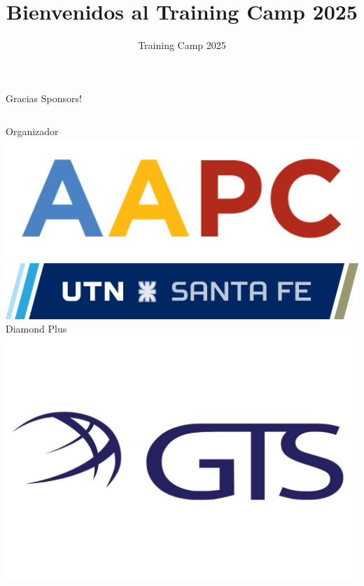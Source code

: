 \documentclass{beamer}
\title %
{Bienvenidos al Training Camp 2025}
\institute[]{Universidad Tecnológica Nacional - Facultad Regional Santa Fe}
\date[TC 2025]{Training Camp 2025}
\begin{document}
\frame{\titlepage}




\begin{frame}{Gracias Sponsors!}
    \begin{columns}[t]
        \centering
        Organizador\\
        \vspace{0.5cm}
        \includegraphics[width=1\textwidth,keepaspectratio]{logos/aapc.png}
        \includegraphics[width=1\textwidth,keepaspectratio]{logos/utn_santafe.png}
        \centering
        Diamond Plus\\
        \includegraphics[width=1\textwidth,keepaspectratio]{logos/GTSlogo.jpeg}
    \end{columns}
\end{frame}
\end{document}
